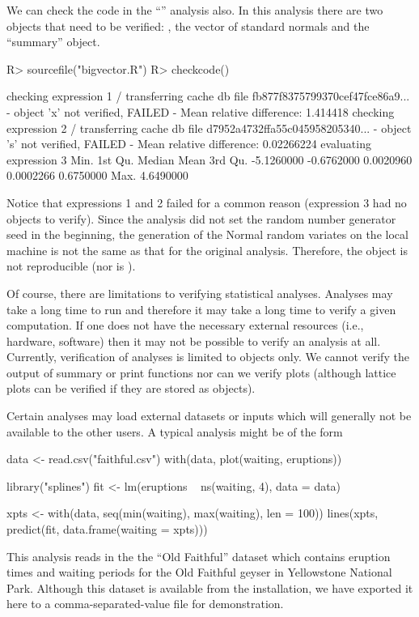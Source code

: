 \documentclass[nojss]{jss}
\begin{document}
We can check the code in the ``'' analysis also.  In this
analysis there are two objects that need to be verified: , the
vector of standard normals and  the ``summary'' object.
\begin{Schunk}
\begin{Sinput}
R> sourcefile("bigvector.R")
R> checkcode()
\end{Sinput}
\begin{Soutput}
checking expression 1
/ transferring cache db file fb877f8375799370cef47fce86a9...
- object 'x' not verified, FAILED
- Mean relative difference: 1.414418
checking expression 2
/ transferring cache db file d7952a4732ffa55c045958205340...
- object 's' not verified, FAILED
- Mean relative difference: 0.02266224
evaluating expression 3
      Min.    1st Qu.     Median       Mean    3rd Qu. 
-5.1260000 -0.6762000  0.0020960  0.0002266  0.6750000 
      Max. 
 4.6490000 
\end{Soutput}
\end{Schunk}
Notice that expressions 1 and 2 failed for a common reason
(expression 3 had no objects to verify).  Since the analysis did not
set the random number generator seed in the beginning, the generation
of the Normal random variates on the local machine is not the same as
that for the original analysis.  Therefore, the object  is not
reproducible (nor is ).

Of course, there are limitations to verifying statistical analyses.
Analyses may take a long time to run and therefore it may take a long
time to verify a given computation.  If one does not have the
necessary external resources (i.e., hardware, software) then it may not
be possible to verify an analysis at all.  Currently, verification of
analyses is limited to  objects only.  We cannot verify the output of
summary or print functions nor can we verify plots (although lattice
plots can be verified if they are stored as  objects).

Certain analyses may load external datasets or inputs which will
generally not be available to the other users.  A typical analysis
might be of the form
\begin{Schunk}
\begin{Soutput}
data <- read.csv("faithful.csv")
with(data, plot(waiting, eruptions))

library("splines")
fit <- lm(eruptions ~ ns(waiting, 4), data = data)

xpts <- with(data, seq(min(waiting), max(waiting), len = 100))
lines(xpts, predict(fit, data.frame(waiting = xpts)))
\end{Soutput}
\end{Schunk}
This analysis reads in the the ``Old Faithful'' dataset which
contains eruption times and waiting periods for the Old Faithful
geyser in Yellowstone National Park.  Although this dataset is
available from the  installation, we have exported it here to a
comma-separated-value file for demonstration.
\end{document}
